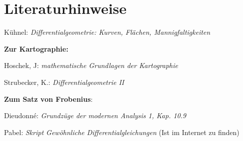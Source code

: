 \chapter*{Literaturhinweise}

Kühnel: \textit{Differentialgeometrie: Kurven, Flächen, Mannigfaltigkeiten}

\textbf{Zur Kartographie:}\par
Hoschek, J: \textit{mathematische Grundlagen der Kartographie} \par
Strubecker, K.: \textit{Differentialgeometrie II}

\textbf{Zum Satz von \textsc Frobenius}: \par
Dieudonné: \textit{Grundzüge der modernen Analysis 1, Kap. 10.9} \par
Pabel: \textit{Skript Gewöhnliche Differentialgleichungen} (Ist im Internet zu finden)